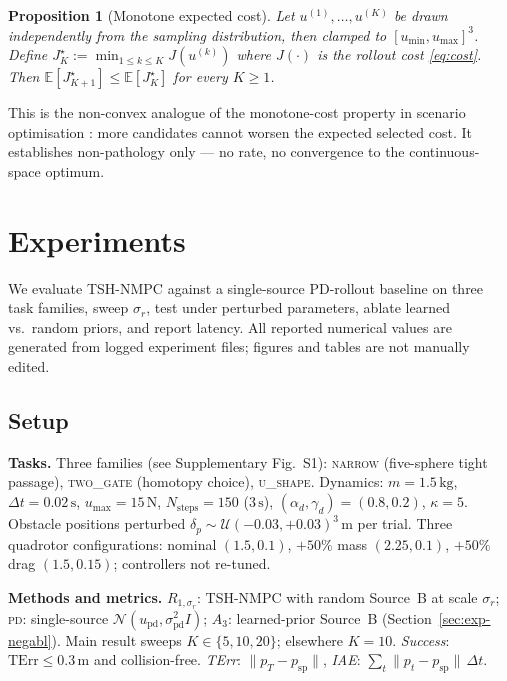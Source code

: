 \documentclass[11pt,onecolumn,a4paper]{article}
\newtheorem{proposition}{Proposition}
\newcommand{\E}{\mathbb{E}}
\newcommand{\spt}{\mathrm{sp}}
\newcommand{\pd}{\mathrm{pd}}
\newcommand{\dt}{\Delta t}
\newcommand{\TErr}{\mathrm{TErr}}
\begin{document}
\begin{proposition}[Monotone expected cost]\label{prop:mono}
Let $u^{(1)},\dots,u^{(K)}$ be drawn independently from the sampling
distribution, then clamped to $[u_{\min}, u_{\max}]^3$.
Define $J^\star_K := \min_{1 \le k \le K} J(u^{(k)})$ where
$J(\cdot)$ is the rollout cost \eqref{eq:cost}. Then
$\E[J^\star_{K+1}] \le \E[J^\star_K]$ for every $K \ge 1$.
\end{proposition}

This is the non-convex analogue of the monotone-cost property in
scenario optimisation \cite{CAM08,CAM18}: more candidates cannot
worsen the expected selected cost. It establishes non-pathology
only --- no rate, no convergence to the continuous-space optimum.

\section{Experiments}\label{sec:experiments}

We evaluate TSH-NMPC against a single-source PD-rollout baseline on
three task families, sweep $\sigma_r$, test under perturbed
parameters, ablate learned vs.\ random priors, and report latency.
All reported numerical values are generated from logged experiment
files; figures and tables are not manually edited.

\subsection{Setup}\label{sec:exp-setup}

\textbf{Tasks.} Three families (see Supplementary Fig.~S1): \textsc{narrow}
(five-sphere tight passage), \textsc{two\_gate} (homotopy choice),
\textsc{u\_shape}. Dynamics: $m = 1.5\,\mathrm{kg}$, $\dt = 0.02\,\mathrm{s}$,
$u_{\max} = 15\,\mathrm{N}$, $N_{\mathrm{steps}} = 150$ ($3\,\mathrm{s}$),
$(\alpha_d,\gamma_d) = (0.8, 0.2)$, $\kappa = 5$. Obstacle positions
perturbed $\delta_p \sim \mathcal{U}(-0.03, +0.03)^3\,\mathrm{m}$ per trial.
Three quadrotor configurations: nominal $(1.5, 0.1)$, $+50\%$ mass
$(2.25, 0.1)$, $+50\%$ drag $(1.5, 0.15)$; controllers not re-tuned.

\label{fig:tasks}
\textbf{Methods and metrics.} $R_{1,\sigma_r}$: TSH-NMPC with random
Source~B at scale $\sigma_r$; \textsc{pd}: single-source
$\mathcal{N}(u_\pd, \sigma_\pd^2 I)$; $A_{3}$: learned-prior
Source~B (Section~\ref{sec:exp-negabl}). Main result sweeps
$K \in \{5, 10, 20\}$; elsewhere $K = 10$. \emph{Success}:
$\TErr \le 0.3\,\mathrm{m}$ and collision-free. \emph{TErr}:
$\|p_T - p_\spt\|$, \emph{IAE}: $\sum_t \|p_t - p_\spt\|\,\dt$.
\end{document}

